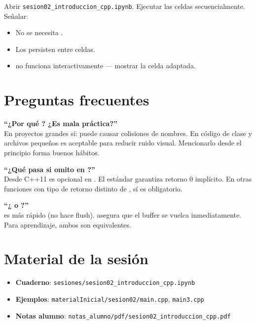 \documentclass[12pt, oneside]{article}
\begin{document}
Abrir \texttt{sesion02\_introduccion\_cpp.ipynb}. Ejecutar las celdas
secuencialmente. Señalar:
\begin{itemize}
  \item No se necesita .
  \item Los  persisten entre celdas.
  \item {} no funciona interactivamente — mostrar la celda adaptada.
\end{itemize}

\section{Preguntas frecuentes}

\begin{notaprofesor}[FAQ]
\textbf{``¿Por qué ? ¿Es mala práctica?''}\\
En proyectos grandes sí: puede causar colisiones de nombres. En código de clase
y archivos pequeños es aceptable para reducir ruido visual. Mencionarlo desde
el principio forma buenos hábitos.

\vspace{0.5em}
\textbf{``¿Qué pasa si omito  en ?''}\\
Desde C++11 es opcional en . El estándar garantiza retorno 0 implícito.
En otras funciones con tipo de retorno distinto de , sí es obligatorio.

\vspace{0.5em}
\textbf{``¿ o \cpp{\\n}?''}\\
\cpp{\\n} es más rápido (no hace flush).  asegura que el buffer
se vuelca inmediatamente. Para aprendizaje, ambos son equivalentes.
\end{notaprofesor}

\section{Material de la sesión}

\begin{itemize}
  \item \textbf{Cuaderno}: \texttt{sesiones/sesion02\_introduccion\_cpp.ipynb}
  \item \textbf{Ejemplos}: \texttt{materialInicial/sesion02/main.cpp},
        \texttt{main3.cpp}
  \item \textbf{Notas alumno}: \texttt{notas\_alumno/pdf/sesion02\_introduccion\_cpp.pdf}
\end{itemize}
\end{document}
